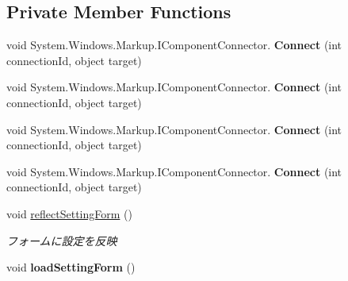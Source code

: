 \subsection*{Private Member Functions}
\begin{DoxyCompactItemize}
\item 
void System.\+Windows.\+Markup.\+I\+Component\+Connector. {\bfseries Connect} (int connection\+Id, object target)\hypertarget{class_reversi4color_wpf_1_1_setting_window_a8848852f763c2b7f4eca1da70753081c}{}\label{class_reversi4color_wpf_1_1_setting_window_a8848852f763c2b7f4eca1da70753081c}

\item 
void System.\+Windows.\+Markup.\+I\+Component\+Connector. {\bfseries Connect} (int connection\+Id, object target)\hypertarget{class_reversi4color_wpf_1_1_setting_window_a8848852f763c2b7f4eca1da70753081c}{}\label{class_reversi4color_wpf_1_1_setting_window_a8848852f763c2b7f4eca1da70753081c}

\item 
void System.\+Windows.\+Markup.\+I\+Component\+Connector. {\bfseries Connect} (int connection\+Id, object target)\hypertarget{class_reversi4color_wpf_1_1_setting_window_a8848852f763c2b7f4eca1da70753081c}{}\label{class_reversi4color_wpf_1_1_setting_window_a8848852f763c2b7f4eca1da70753081c}

\item 
void System.\+Windows.\+Markup.\+I\+Component\+Connector. {\bfseries Connect} (int connection\+Id, object target)\hypertarget{class_reversi4color_wpf_1_1_setting_window_a8848852f763c2b7f4eca1da70753081c}{}\label{class_reversi4color_wpf_1_1_setting_window_a8848852f763c2b7f4eca1da70753081c}

\item 
void \hyperlink{class_reversi4color_wpf_1_1_setting_window_a768840bbf4baf723e039d187a7ee3def}{reflect\+Setting\+Form} ()
\begin{DoxyCompactList}\small\item\em フォームに設定を反映 \end{DoxyCompactList}\item 
void {\bfseries load\+Setting\+Form} ()\hypertarget{class_reversi4color_wpf_1_1_setting_window_a524332372bd67c0bf1c2f5f6c9f75689}{}\label{class_reversi4color_wpf_1_1_setting_window_a524332372bd67c0bf1c2f5f6c9f75689}


\end{DoxyCompactItemize}
